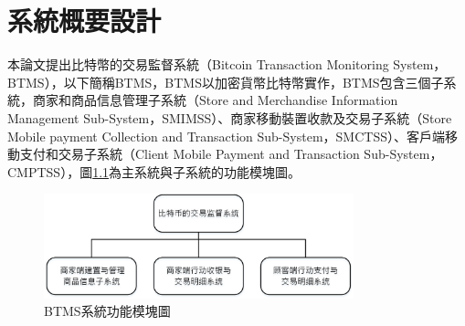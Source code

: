 \chapter{系統概要設計} 


	本論文提出比特幣的交易監督系統（Bitcoin Transaction Monitoring System，BTMS）\supercite{Blockchain-basedpaymentcollectionsupervisionsystemusingpervasiveBitcoindigitalwallet}，以下簡稱BTMS，BTMS以加密貨幣比特幣實作，BTMS包含三個子系統，商家和商品信息管理子系統（Store and Merchandise Information Management Sub-System，SMIMSS）、商家移動裝置收款及交易子系統（Store Mobile payment Collection and Transaction Sub-System，SMCTSS）、客戶端移動支付和交易子系統（Client Mobile Payment and Transaction Sub-System，CMPTSS），圖\ref{model0}為主系統與子系統的功能模塊圖。

	\begin{figure}[!htbp]
		\centering
		\includegraphics[width = 0.8\textwidth]{model0.jpg}
		\caption{BTMS系統功能模塊圖}\label{model0}
	\end{figure}

